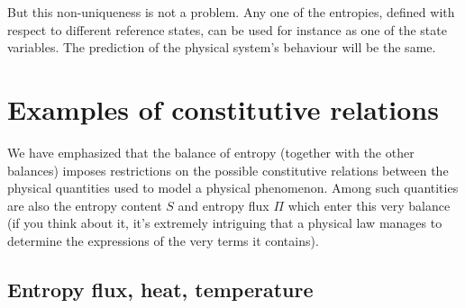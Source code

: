\documentclass[a4paper,12pt,%
onecolumn,oneside,%
british%
]{memoir}
\renewcommand*{\|}[1][]{\nonscript\:#1\vert\nonscript\:\mathopen{}}
\newcommand*{\yS}{S}
\newcommand*{\yB}{\varPi}
\begin{document}
But this non-uniqueness is not a problem. Any one of the entropies, defined with respect to different reference states, can be used for instance as one of the  state variables. The prediction of the physical system's behaviour will be the same.

\section{Examples of constitutive relations}
\label{sec:entropy_constitutive}

We have emphasized that the balance of entropy (together with the other balances) imposes restrictions on the possible constitutive relations between the physical quantities used to model a physical phenomenon. Among such quantities are also the entropy content $\yS$ and entropy flux $\yB$ which enter this very balance (if you think about it, it's extremely intriguing that a physical law manages to determine the expressions of the very terms it contains).

\subsection{Entropy flux, heat, temperature}
\label{sec:entropyflux_const}
\end{document}
